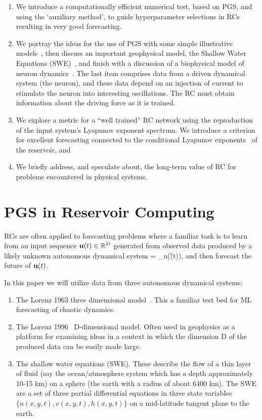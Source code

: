 \documentclass[12pt]{article}
\begin{document}
\begin{enumerate}
\item We introduce a computationally efficient numerical test, based on PGS, and using the `auxiliary method', to guide hyperparameter selections in RCs resulting in very good forecasting.
\item We portray the ideas for the use of PGS with some simple illustrative models~\cite{lor63,lor96,lorman98}, then discuss an important geophysical model, the Shallow Water Equations (SWE)~\cite{sadourny75,pedlosky1986,vallis17}, and finish with a discussion of a biophysical model of neuron dynamics~\cite{jwu,willshaw}. The last item comprises data from a driven dynamical system (the neuron), and these data depend on an injection of current to stimulate the neuron into interesting oscillations. The RC must obtain information about the driving force as it is trained.
\item We explore a metric for a ``well trained'' RC network using the reproduction of the input system's Lyapunov exponent spectrum. We introduce a criterion for excellent forecasting connected to the conditional Lyapunov exponents~\cite{pc90} of the reservoir, and
\item We briefly address, and speculate about, the long-term value of RC for problems encountered in physical systems.
\end{enumerate}

\section{PGS in Reservoir Computing}
RCs are often applied to forecasting problems where a familiar task is to learn from an input sequence $\mbox{$\bf{u}$}(t) \in {\mathbb R}^D$ generated from observed data produced by a likely unknown autonomous dynamical system
\be 
{} = \F_u(\u(t)),
\label{autondatasource}
\ee
and then forecast the future of $\mbox{$\bf{u}$}(t)$.

In this paper we will utilize data from three autonomous dynamical systems:
\begin{enumerate}
\item The Lorenz 1963 three dimensional model~\cite{lor63}. This a familiar test bed for ML forecasting of chaotic dynamics.
\item The Lorenz 1996~\cite{lor96} D-dimensional model. Often used in geophysics as a platform for examining ideas in a context in which the dimension D of the produced data can be easily made large.
\item The shallow water equations (SWE). These describe the flow of a thin layer of fluid (say the ocean/atmosphere system which has a depth approximately 10-15 km) on a sphere (the earth with a radius of about 6400 km). The SWE are a set of three partial differential equations in three state variables $\{u(x,y,t),v(x,y,t),h(x,y,t)\}$  on a mid-latitude tangent plane to the earth.
\end{enumerate} 
\end{document}
